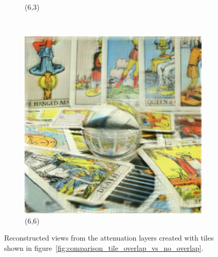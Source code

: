 \documentclass[11pt,a4paper,titlepage]{article}
\begin{document}
\begin{figure}
\begin{subfigure}[t]{0.3\textwidth}
		\caption{(6,3)}
	\end{subfigure}%
	~
	\begin{subfigure}[t]{0.3\textwidth}
		\includegraphics[width=\textwidth]{results/tile_blending/tarot6x6x512x512-512x512x5-sampling=2x_tileRes=200x200_overlap=0.5/Reconstruction_of_view_(6,6).png}
		\caption{(6,6)}
	\end{subfigure}%
	
	\caption{Reconstructed views from the attenuation layers created with tiles shown in figure~\ref{fig:comparison_tile_overlap_vs_no_overlap}.}
	\label{fig:Reconstructions_from_tiled_attenuator}
\end{figure}
\end{document}
